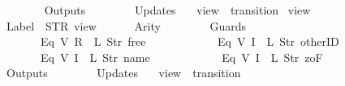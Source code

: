\begin{isabellebody}
\ \ \ \ \ \ {\isacharbrackright}{\isacharcomma}\isanewline
\ \ \ \ \ \ Outputs\ {\isacharequal}\ {\isacharbrackleft}{\isacharbrackright}{\isacharcomma}\isanewline
\ \ \ \ \ \ Updates\ {\isacharequal}\ {\isacharbrackleft}{\isacharbrackright}\isanewline
{\isasymrparr}{\isachardoublequoteclose}\isanewline
\isanewline
{}\isamarkupfalse%
\ {\isachardoublequoteopen}view{}{\isachardoublequoteclose}\ {\isacharcolon}{\isacharcolon}\ {\isachardoublequoteopen}transition{\isachardoublequoteclose}\ \isanewline
{\isachardoublequoteopen}view{}\ {\isasymequiv}\ {\isasymlparr}\isanewline
\ \ \ \ \ \ Label\ {\isacharequal}\ STR\ {\isacharprime}{\isacharprime}view{\isacharprime}{\isacharprime}{\isacharcomma}\isanewline
\ \ \ \ \ \ Arity\ {\isacharequal}\ {}{\isacharcomma}\isanewline
\ \ \ \ \ \ Guards\ {\isacharequal}\ {\isacharbrackleft}\isanewline
\ \ \ \ \ \ \ \ \ \ \ \ Eq\ {\isacharparenleft}V\ {\isacharparenleft}R\ {}{\isacharparenright}{\isacharparenright}\ {\isacharparenleft}L\ {\isacharparenleft}Str\ {\isacharprime}{\isacharprime}free{\isacharprime}{\isacharprime}{\isacharparenright}{\isacharparenright}{\isacharcomma}\isanewline
\ \ \ \ \ \ \ \ \ \ \ \ Eq\ {\isacharparenleft}V\ {\isacharparenleft}I\ {}{\isacharparenright}{\isacharparenright}\ {\isacharparenleft}L\ {\isacharparenleft}Str\ {\isacharprime}{\isacharprime}otherID{\isacharprime}{\isacharprime}{\isacharparenright}{\isacharparenright}{\isacharcomma}\isanewline
\ \ \ \ \ \ \ \ \ \ \ \ Eq\ {\isacharparenleft}V\ {\isacharparenleft}I\ {}{\isacharparenright}{\isacharparenright}\ {\isacharparenleft}L\ {\isacharparenleft}Str\ {\isacharprime}{\isacharprime}name{\isacharprime}{\isacharprime}{\isacharparenright}{\isacharparenright}{\isacharcomma}\isanewline
\ \ \ \ \ \ \ \ \ \ \ \ Eq\ {\isacharparenleft}V\ {\isacharparenleft}I\ {}{\isacharparenright}{\isacharparenright}\ {\isacharparenleft}L\ {\isacharparenleft}Str\ {\isacharprime}{\isacharprime}{}zoF{\isacharprime}{\isacharprime}{\isacharparenright}{\isacharparenright}\isanewline
\ \ \ \ \ \ {\isacharbrackright}{\isacharcomma}\isanewline
\ \ \ \ \ \ Outputs\ {\isacharequal}\ {\isacharbrackleft}{\isacharbrackright}{\isacharcomma}\isanewline
\ \ \ \ \ \ Updates\ {\isacharequal}\ {\isacharbrackleft}{\isacharbrackright}\isanewline
{\isasymrparr}{\isachardoublequoteclose}\isanewline
\isanewline
{}\isamarkupfalse%
\ {\isachardoublequoteopen}view{}{\isachardoublequoteclose}\ {\isacharcolon}{\isacharcolon}\ {\isachardoublequoteopen}transition{\isachardoublequoteclose}\ \isanewline

\end{isabellebody}
